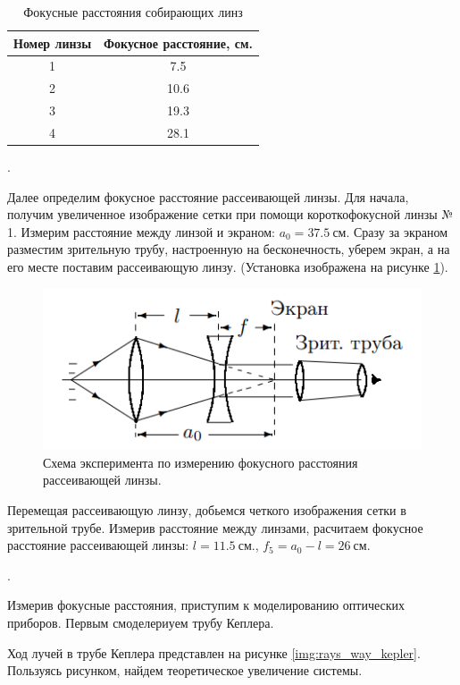 \documentclass[a4paper, 12pt]{article}
\newcounter{Points}
\newcommand{\point}{\arabic{Points}. \addtocounter{Points}{1}}
\begin{document}
\begin{table}[h]
    \centering
    \begin{tabular}{|c|c|}
    \hline 
        Номер линзы & Фокусное расстояние, см. \\ \hline
        1 &  7.5        \\ \hline
        2 &  10.6       \\ \hline
        3 &  19.3       \\ \hline
        4 &  28.1       \\ \hline
        
    \end{tabular}
    \caption{Фокусные расстояния собирающих линз}
    \label{tabl:collecting_preciese_focuses}
\end{table}

\point Далее определим фокусное расстояние рассеивающей линзы. Для начала, получим увеличенное изображение сетки при помощи короткофокусной линзы № 1. Измерим расстояние между линзой и экраном: $a_0 = 37.5~ см.$ Сразу за экраном разместим зрительную трубу, настроенную на бесконечность, уберем экран, а на его месте поставим рассеивающую линзу. (Установка изображена на рисунке \ref{img:scatter_lens}). 

\begin{figure}[h]
    \centering
    \includegraphics[scale=0.7]{minus_lens.png}
    \caption{Схема эксперимента по измерению фокусного расстояния рассеивающей линзы.}
    \label{img:scatter_lens}
\end{figure}

Перемещая рассеивающую линзу, добьемся четкого изображения сетки в зрительной трубе. Измерив расстояние между линзами, расчитаем фокусное расстояние рассеивающей линзы: $l = 11.5 ~ см. $, $f_5 = a_0 - l = 26 ~ см.$

\point Измерив фокусные расстояния, приступим к моделированию оптических приборов. Первым смоделериуем трубу Кеплера. 

Ход лучей в трубе Кеплера представлен на рисунке \ref{img:rays_way_kepler}. Пользуясь рисунком, найдем теоретическое увеличение системы.
\end{document}
